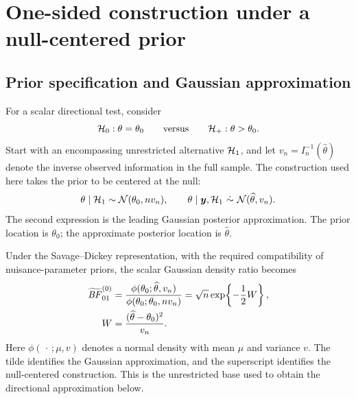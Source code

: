 \documentclass[11pt,letterpaper]{article}
\begin{document}
\section{One-sided construction under a null-centered prior}
\subsection{Prior specification and Gaussian approximation}
For a scalar directional test, consider
\begin{equation}
 \mathcal H_0:\theta=\theta_0
 \qquad\text{versus}\qquad
 \mathcal H_+:\theta>\theta_0 .
 \label{eq:hypotheses}
\end{equation}
Start with an encompassing unrestricted alternative \(\mathcal H_1\), and let
\(v_n=I_n^{-1}(\widehat\theta)\) denote the inverse observed information in
the full sample. The construction used here takes the prior to be
centered at the null:
\begin{equation}
 \theta\mid\mathcal H_1\sim\mathcal N(\theta_0,nv_n),
 \qquad
 \theta\mid\boldsymbol y,\mathcal H_1 \ \dot\sim\ \mathcal N(\widehat\theta,v_n).
 \label{eq:null-centered}
\end{equation}
The second expression is the leading Gaussian posterior approximation.
The prior location is \(\theta_0\); the approximate posterior location is
\(\widehat\theta\).

Under the Savage--Dickey representation, with the required compatibility
of nuisance-parameter priors, the scalar Gaussian density ratio becomes
\begin{align}
 \widetilde{\mathit{BF}}_{01}^{(0)}
 &=
 \frac{\phi(\theta_0;\widehat\theta,v_n)}
      {\phi(\theta_0;\theta_0,nv_n)}
 =\sqrt n\exp\!\left\{-\frac12 W\right\},
 \label{eq:null-ratio}\\
 W&=\frac{(\widehat\theta-\theta_0)^2}{v_n}.
 \nonumber
\end{align}
Here \(\phi(\,\cdot\,;\mu,v)\) denotes a normal density with mean \(\mu\)
and variance \(v\). The tilde identifies the Gaussian approximation,
and the superscript identifies the null-centered construction. This is
the unrestricted base used to obtain the directional approximation below.
\end{document}

